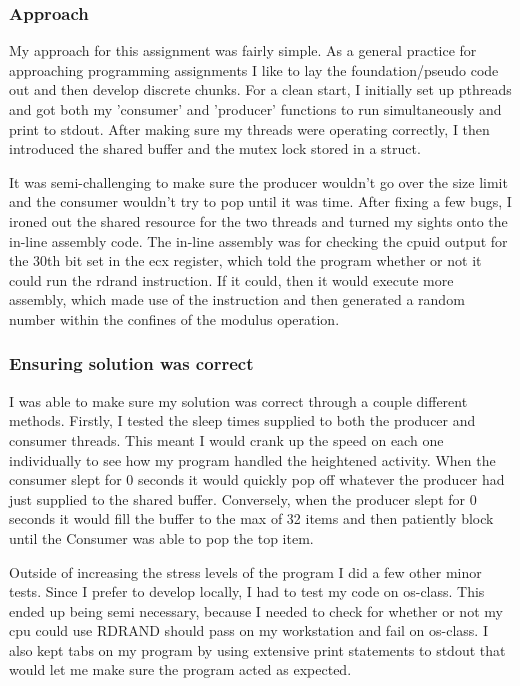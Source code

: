 \documentclass[10pt,draftclsnofoot,onecolumn]{IEEEtran}
\begin{document}
\subsubsection{Approach}
My approach for this assignment was fairly simple.
As a general practice for approaching programming assignments I like to lay the foundation/pseudo code out and then develop discrete chunks.
For a clean start, I initially set up pthreads and got both my 'consumer' and 'producer' functions to run simultaneously and print to stdout.
After making sure my threads were operating correctly, I then introduced the shared buffer and the mutex lock stored in a struct.

It was semi-challenging to make sure the producer wouldn't go over the size limit and the consumer wouldn't try to pop until it was time.
After fixing a few bugs, I ironed out the shared resource for the two threads and turned my sights onto the in-line assembly code.
The in-line assembly was for checking the cpuid output for the 30th bit set in the ecx register, which told the program whether or not it could run the rdrand instruction.
If it could, then it would execute more assembly, which made use of the instruction and then generated a random number within the confines of the modulus operation.

\subsubsection{Ensuring solution was correct}
I was able to make sure my solution was correct through a couple different methods.
Firstly, I tested the sleep times supplied to both the producer and consumer threads.
This meant I would crank up the speed on each one individually to see how my program handled the heightened activity.
When the consumer slept for 0 seconds it would quickly pop off whatever the producer had just supplied to the shared buffer.
Conversely, when the producer slept for 0 seconds it would fill the buffer to the max of 32 items and then patiently block until the Consumer was able to pop the top item.

Outside of increasing the stress levels of the program I did a few other minor tests.
Since I prefer to develop locally, I had to test my code on os-class.
This ended up being semi necessary, because I needed to check for whether or not my cpu could use RDRAND should pass on my workstation and fail on os-class.
I also kept tabs on my program by using extensive print statements to stdout that would let me make sure the program acted as expected.
\end{document}

